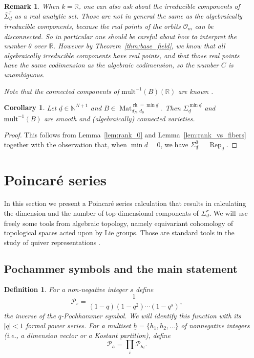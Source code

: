 \documentclass[a4paper]{amsart}
\DeclareMathOperator{\rk}{rk}
\DeclareMathOperator{\Rep}{\mathrm{Rep}}
\DeclareMathOperator{\Mat}{\mathrm{Mat}}
\newcommand{\R}{\mathbb{R}}
\newcommand{\N}{\mathbb{N}}
\newcommand{\CO}{\mathcal{O}}
\newcommand{\CP}{\mathcal{P}}
\newcommand{\um}{\underline{m}}
\newcommand{\ud}{\underline{d}}
\newcommand{\mult}{\mathrm{mult}}
\newcommand{\cSigma}{\overline{\Sigma}}
\newtheorem{defn}[thm]{Definition}
\newtheorem{cor}[thm]{Corollary}
\theoremstyle{plain}
\newtheorem{remark}[thm]{Remark}
\begin{document}
\begin{remark}\label{rmk:real_points} \rm
    When $k=\R$, one can also ask about the irreducible components of $\cSigma^r_{\ud}$ as a \emph{real analytic set}. Those are not in general the same as the algebraically irreducible components, because the real points of the orbits $\CO_{\um}$ can be disconnected. So in particular one should be careful about how to interpret the number $\theta$ over $\R$. However by Theorem~\ref{thm:base_field}, we know that all algebraically irreducible components have real points, and that those real points have the same codimension as the algebraic codimension, so the number $C$ is unambiguous.

    Note that the connected components of $\mult^{-1}(B)(\R)$ are known \cite[Theorem 5]{trager-kohn-bruna:DLN-spurious-critical}.
\end{remark}


\begin{cor}\label{cor:min_ud}
 Let $\ud\in \N^{N+1}$ and $B\in \Mat_{d_N,d_0}^{\rk=\min{\ud}}$. Then $\Sigma^{\min{\ud}}_{\ud}$ and $\mult^{-1}(B)$ are smooth and (algebraically) connected varieties. 
\end{cor}
\begin{proof}
 This follows from Lemma~\ref{lem:rank_0} and Lemma~\ref{lem:rank_vs_fibers} together with the observation that, when $\min{\ud}=0$, we have $\Sigma^0_{\ud}=\Rep_{\ud}$.
\end{proof}

\section{Poincar\'e series} \label{sec:PoincareSection}
In this section we present a Poincar\'e series calculation that results in calculating the dimension and the number of top-dimensional components of $\Sigma_{\ud}^r$. We will use freely some tools from algebraic topology, namely equivariant cohomology of topological spaces acted upon by Lie groups. Those are standard tools in the study of quiver representations \cite{Reineke,RRcoha}.
\subsection{Pochammer symbols and the main statement}

\begin{defn}
    For a non-negative integer $s$ define
    \[
    \CP_s=\frac{1}{(1-q)(1-q^2)\cdots (1-q^s)},\]
    the inverse of the $q$-Pochhammer symbol. We will identify this function with its $|q|<1$ formal power series. For a multiset $\underline{h}=\{h_1,h_2,\ldots\}$ of nonnegative integers (i.e., a dimension vector or a Kostant partition), define 
    \[
    \CP_{\underline{h}}=\prod_i \CP_{h_i}.
    \]
\end{defn}
\end{document}
